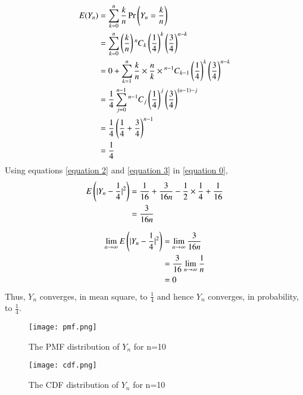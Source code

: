 \documentclass[journal,12pt,twocolumn]{IEEEtran}
\begin{document}
\begin{align}
    E(Y_n) &= \sum_{k=0}^n\frac{k}{n}\Pr{\brak{Y_n=\frac{k}{n}}}
    \\&= \sum_{k=0}^{n} \brak{\frac{k}{n}}\comb[n]{k} \brak{\frac{1}{4}}^{k} \brak{\frac{3}{4}}^{n-k}
    \\&= 0 + \sum_{k=1}^{n} \frac{k}{n}\times\frac{n}{k}\times\comb[n-1]{k-1}\brak{\frac{1}{4}}^{k} \brak{\frac{3}{4}}^{n-k}
    \\&= \frac{1}{4}\sum_{j=0}^{n-1} \comb[n-1]{j}\brak{\frac{1}{4}}^{j} \brak{\frac{3}{4}}^{(n-1)-j}
    \\&= \frac{1}{4}\brak{\frac{1}{4} + \frac{3}{4}}^{n-1}
    \\&= \frac{1}{4} \label{equation 3}
\end{align}
Using equations \eqref{equation 2} and \eqref{equation 3} in \eqref{equation 0},
\begin{align}
    E\brak{\lvert Y_n-\frac{1}{4}\rvert^2} &= \frac{1}{16}+ \frac{3}{16n}-\frac{1}{2}\times\frac{1}{4} + \frac{1}{16}
    \\&= \frac{3}{16n}
\end{align}

\begin{align}
    \lim_{n\rightarrow \infty} E\brak{\lvert Y_n-\frac{1}{4}\rvert^2} &=  \lim_{n\rightarrow \infty}  \frac{3}{16n}
    \\&= \frac{3}{16}\lim_{n\rightarrow \infty}\frac{1}{n}
    \\&= 0
\end{align}
Thus, $Y_n$ converges, in mean square, to $\frac{1}{4}$ and hence $Y_n$ converges, in probability, to $\frac{1}{4}$.
 
\begin{figure} [H]
    \texttt{[image: pmf.png]}
    \caption{The PMF distribution of $Y_n$ for n=10}
    \label{Fig 1}
\end{figure}
\begin{figure} [H]
    \texttt{[image: cdf.png]}
    \caption{The CDF distribution of $Y_n$ for n=10}
    \label{Fig 2}
\end{figure}
\end{document}
